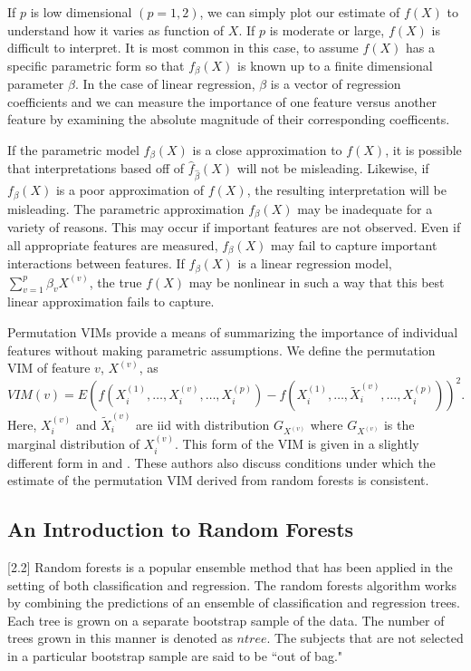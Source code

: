 \documentclass[article,shortnames]{jss}
\begin{document}
If $p$ is low dimensional $(p=1,2)$, we can simply plot our estimate of $f(X)$ to understand how it varies as function of $X$. 
If $p$ is moderate or large, $f(X)$ is difficult to interpret.  It is most common in this case, to assume $f(X)$ has a specific parametric
form so that $f_{\beta}(X)$ is known up to a finite dimensional parameter $\beta$.  In the case of linear regression, $\beta$ is a vector of
regression coefficients and we can measure the importance of one feature versus another feature by examining the absolute magnitude 
of their corresponding coefficents.    

If the parametric model $f_{\beta}(X)$ is a close approximation to $f(X)$, it is possible that interpretations based off of $\hat{f}_{\hat{\beta}}(X)$
will not be misleading.  Likewise, if $f_{\beta}(X)$ is a poor approximation of $f(X)$, the resulting interpretation will be misleading.  
The parametric approximation $f_{\beta}(X)$ may be inadequate for a variety of reasons.  This may occur if important features are 
not observed.  Even if all appropriate features are measured, $f_{\beta}(X)$ may fail to capture important interactions between features.
If $f_{\beta}(X)$ is a linear regression model, $\sum_{v=1}^{p}\beta_{v}X^{(v)}$, the true $f(X)$ may be nonlinear in such a way that this best linear approximation fails to capture.
  
Permutation VIMs provide a means of summarizing the importance of individual features without making parametric assumptions.
We define the permutation VIM of feature $v$, $X^{(v)}$, as 
\begin{equation}
VIM(v)=E(f(X^{(1)}_{i},\ldots,X^{(v)}_{i},\ldots,X^{(p)}_{i}) - f(X^{(1)}_{i},\ldots,\tilde{X}^{(v)}_{i},\ldots,X^{(p)}_{i}))^{2}.
\end{equation}
Here, $X^{(v)}_{i}$ and $\tilde{X}^{(v)}_{i}$ are iid with distribution $G_{X^{(v)}}$ where $G_{X^{(v)}}$ is the marginal distribution of $X^{(v)}_{i}$.  This form of the VIM
is given in a slightly different form in \citep{gregorutti2013correlation} and \citep{zhu2012reinforcement}.  These authors also discuss conditions under
which the estimate of the permutation VIM derived from random forests is consistent. 

         
\subsection{An Introduction to Random Forests}[2.2]
Random forests is a popular ensemble method that has been applied in the setting of both classification and regression.  The random forests algorithm works
by combining the predictions of an ensemble of classification and regression trees.  Each tree is grown on a separate bootstrap sample of the data.  The number
of trees grown in this manner is denoted as $ntree$.  The subjects that are not selected in a particular bootstrap sample are said to be ``out of bag."  
\end{document}
